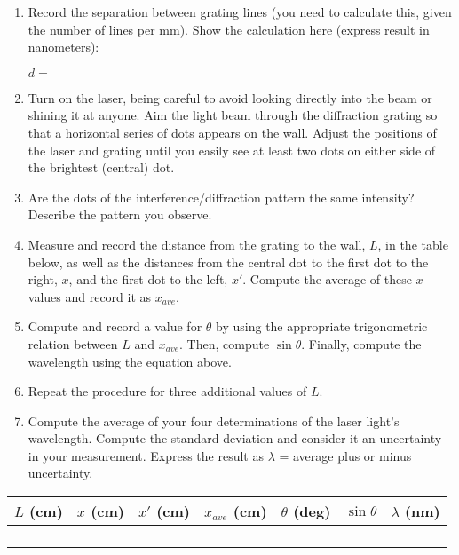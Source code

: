 \begin{enumerate}[labparts]
\item Record the separation between grating lines (you need to calculate this, given the number of lines per mm). Show the calculation here (express result in nanometers):

\( d= \)
\vspace{10mm}
\item Turn on the laser, being careful to avoid looking directly into the
beam or shining it at anyone. Aim the light beam through the diffraction
grating so that a horizontal series of dots appears on the wall. Adjust
the positions of the laser and grating until you easily see at least
two dots on either side of the brightest (central) dot.
\item Are the dots of the interference/diffraction pattern the same intensity?
Describe the pattern you observe.\vspace{15mm}

\item Measure and record the distance from the grating to the wall, $L$, in 
the table below, as well as the distances from the central dot to the first 
dot to the right, $x$, and the first dot to the left, $x'$. Compute the average
of these $x$ values and record it as $x_{ave}$.
\item Compute and record a value for $\theta$ by using the appropriate 
trigonometric relation between $L$ and $x_{ave}$. Then, compute $\sin \theta$. 
Finally, compute the wavelength using the equation above.
\item Repeat the procedure for three additional values of $L$.
\item Compute the average of your four determinations of the laser light's
wavelength. Compute the standard deviation and consider it an uncertainty in 
your measurement. Express the result as $\lambda$ = average plus or minus 
uncertainty.

\end{enumerate}
\vspace{15mm}
\begin{center}
\begin{tabular}{|c|c|c|c|c|c|c|}
\hline 
\( L \) (cm)&
\( x \) (cm)&
\( x' \) (cm)&
\( x_{ave} \) (cm)&
\( \theta  \) (deg)&
\( \sin \theta  \)&
\( \lambda  \) (nm)\\
\hline
\hline 
&
&
&
&
&
&
\\
\hline 
&
&
&
&
&
&
\\
\hline 
&
&
&
&
&
&
\\
\hline 
&
&
&
&
&
&
\\
\hline
\end{tabular}\vspace{0.3cm}

\end{center}

